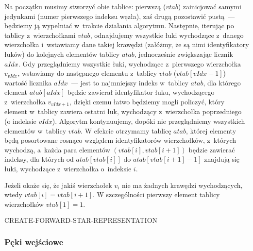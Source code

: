 Na początku musimy stworzyć obie tablice: pierwszą ($vtab$) zainicjować samymi jedynkami (numer pierwszego indeksu węzła), zaś drugą pozostawić pustą~---  będziemy ją wypełniać w~trakcie działania algorytmu. Następnie, iterując po tablicy z~wierzchołkami $vtab$, odnajdujemy wszystkie łuki wychodzące z~danego wierzchołka i~wstawiamy dane takiej krawędzi (załóżmy, że są nimi identyfikatory łuków) do kolejnych elementów tablicy $atab$, jednocześnie zwiększając licznik $aIdx$. Gdy przeglądniemy wszystkie łuki, wychodzące z~pierwszego wierzchołka $v_{vIdx}$, wstawiamy do następnego elementu z~tablicy $vtab$ ($vtab \left[ vIdx+1 \right] $) wartość licznika $aIdx$~---  jest to najmniejszy indeks w~tablicy $atab$, dla którego element $atab \left[ aIdx \right] $ będzie zawierał identyfikator łuku, wychodzącego z~wierzchołka $v_{vIdx+1}$, dzięki czemu łatwo będziemy mogli policzyć, który element w~tablicy zawiera ostatni łuk, wychodzący z~wierzchołka poprzedniego (o indeksie $vIdx$). Algorytm kontynuujemy, dopóki nie przeglądniemy wszystkich elementów w~tablicy $vtab$. W efekcie otrzymamy tablicę $atab$, której elementy będą posortowane rosnąco względem identyfikatorów wierzchołków, z~których wychodzą, a~każda para elementów $ \left( vtab \left[ i \right] , vtab \left[ i+1 \right] \right) $ będzie zawierać indeksy, dla których od $atab \left[ vtab \left[ i \right] \right] $ do $atab \left[ vtab \left[ i+1 \right] -1 \right] $ znajdują się łuki, wychodzące z~wierzchołka o~indeksie $i$.

Jeżeli okaże się, że jakiś wierzchołek $v_{i}$ nie ma żadnych krawędzi wychodzących, wtedy $vtab \left[ i \right] = vtab \left[ i+1 \right] $. W szczególności pierwszy element tablicy wierzchołków $vtab \left[ 1 \right] = 1$.

\begin{algorithm}[!htbp]
\DontPrintSemicolon
{}
\caption{CREATE-FORWARD-STAR-REPRESENTATION\label{alg:cfsr}}
\end{algorithm}


\subsubsection{Pęki wejściowe}

